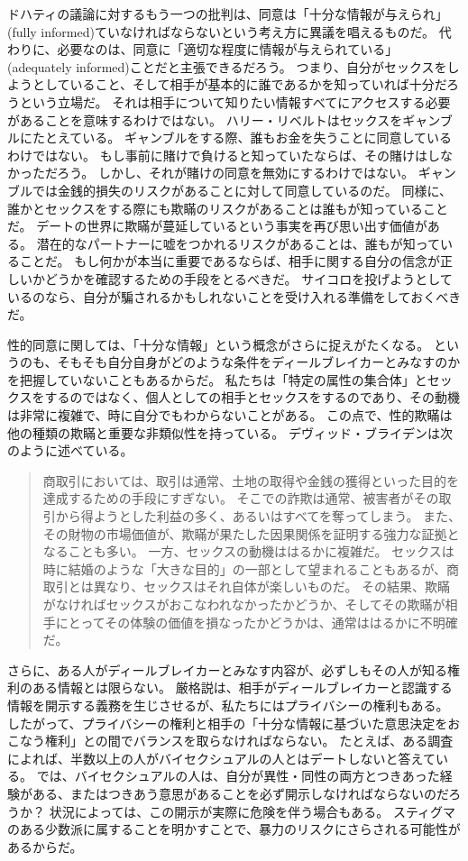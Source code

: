 \documentclass[paper=a4,book,openany]{jlreq}
\begin{document}
ドハティの議論に対するもう一つの批判は、同意は「十分な情報が与えられ」(fully informed)ていなければならないという考え方に異議を唱えるものだ。
代わりに、必要なのは、同意に「適切な程度に情報が与えられている」(adequately informed)ことだと主張できるだろう。
つまり、自分がセックスをしようとしていること、そして相手が基本的に誰であるかを知っていれば十分だろうという立場だ。
それは相手について知りたい情報すべてにアクセスする必要があることを意味するわけではない。
ハリー・リベルトはセックスをギャンブルにたとえている。
ギャンブルをする際、誰もお金を失うことに同意しているわけではない。
もし事前に賭けで負けると知っていたならば、その賭けはしなかっただろう。
しかし、それが賭けの同意を無効にするわけではない。
ギャンブルでは金銭的損失のリスクがあることに対して同意しているのだ。
同様に、誰かとセックスをする際にも欺瞞のリスクがあることは誰もが知っていることだ。
\citep[p.132]{liberto17:_inten_sexual_consen}
デートの世界に欺瞞が蔓延しているという事実を再び思い出す価値がある。
潜在的なパートナーに嘘をつかれるリスクがあることは、誰もが知っていることだ。
もし何かが本当に重要であるならば、相手に関する自分の信念が正しいかどうかを確認するための手段をとるべきだ。
サイコロを投げようとしているのなら、自分が騙されるかもしれないことを受け入れる準備をしておくべきだ。

性的同意に関しては、「十分な情報」という概念がさらに捉えがたくなる。
というのも、そもそも自分自身がどのような条件をディールブレイカーとみなすのかを把握していないこともあるからだ。
私たちは「特定の属性の集合体」とセックスをするのではなく、個人としての相手とセックスをするのであり、その動機は非常に複雑で、時に自分でもわからないことがある。
この点で、性的欺瞞は他の種類の欺瞞と重要な非類似性を持っている。
デヴィッド・ブライデンは次のように述べている。
\begin{quote}
商取引においては、取引は通常、土地の取得や金銭の獲得といった目的を達成するための手段にすぎない。
そこでの詐欺は通常、被害者がその取引から得ようとした利益の多く、あるいはすべてを奪ってしまう。
また、その財物の市場価値が、欺瞞が果たした因果関係を証明する強力な証拠となることも多い。
一方、セックスの動機ははるかに複雑だ。
セックスは時に結婚のような「大きな目的」の一部として望まれることもあるが、商取引とは異なり、セックスはそれ自体が楽しいものだ。
その結果、欺瞞がなければセックスがおこなわれなかったかどうか、そしてその欺瞞が相手にとってその体験の価値を損なったかどうかは、通常ははるかに不明確だ。
\citep[p.463]{bryden00:_redef_rape}

\end{quote}

さらに、ある人がディールブレイカーとみなす内容が、必ずしもその人が知る権利のある情報とは限らない。
厳格説は、相手がディールブレイカーと認識する情報を開示する義務を生じさせるが、私たちにはプライバシーの権利もある。
したがって、プライバシーの権利と相手の「十分な情報に基づいた意思決定をおこなう権利」との間でバランスを取らなければならない。
たとえば、ある調査によれば、半数以上の人がバイセクシュアルの人とはデートしないと答えている\citep{thorpe16:_why_won_some_peopl_date_bisex}。
では、バイセクシュアルの人は、自分が異性・同性の両方とつきあった経験がある、またはつきあう意思があることを必ず開示しなければならないのだろうか？ 状況によっては、この開示が実際に危険を伴う場合もある。
スティグマのある少数派に属することを明かすことで、暴力のリスクにさらされる可能性があるからだ。
\end{document}
